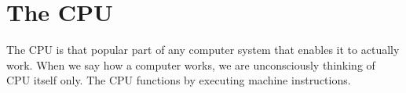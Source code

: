 \documentclass{article}
\begin{document}
\section{The CPU}
The CPU is that popular part of any computer system that enables it to actually work. When we say how a computer works, we are unconsciously thinking of CPU itself only. The CPU functions by executing machine instructions.
\end{document}

